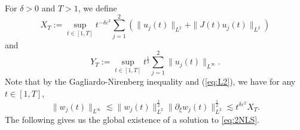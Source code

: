 \documentclass[11pt,a4paper,twosides]{amsart}
\theoremstyle{plain}
\newtheorem{proposition}[theorem]{Proposition}
\theoremstyle{remark}
\numberwithin{equation}{section}
\newcommand{\R}{\mathbb{R}}
\def\le{\leqslant}
\newcommand{\pt}{\partial}
\theoremstyle{definition}
\newcommand{\1}{{\bf 1}_{\{|x| < |t|\}}}
\renewcommand{\epsilon}{\varepsilon}
\begin{document}

For $\delta > 0$ and $T > 1$, we define
\begin{equation}
  X_T := \sup_{t \in [1,T]}t^{-\delta\epsilon^2}
  \sum_{j = 1}^2(\|u_j(t)\|_{L^2} + \|J(t)u_j(t)\|_{L^2})
\end{equation}
and
\begin{equation}
  Y_T := \sup_{t \in [1,T]}t^{\frac12}\sum_{j=1}^2\|u_j(t)\|_{L^\infty}.
\end{equation}
Note that by the Gagliardo-Nirenberg inequality and (\ref{eq:L2}), 
we have for any $t\in [1,T]$, 
\begin{equation}\label{eq:wjinfty}
\|w_j(t)\|_{L^\infty} 
\lesssim
\|w_j(t)\|_{L^2}^{\frac12}
\|\pt_{\xi}w_j(t)\|_{L^2}^{\frac12}
\lesssim 
t^{\delta\varepsilon^2}X_T.
\end{equation}
The following gives us the global existence of a solution to \eqref{eq:2NLS}.
\end{document}
